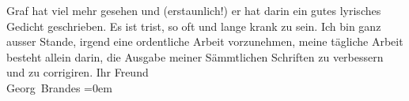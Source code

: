 \begin{ledgroupsized}[t]{13cm}
                    Graf hat viel mehr gesehen und (erstaunlich!) er hat darin ein gutes lyrisches
                    Gedicht geschrieben.\pend
           \pstart
           Es ist trist, so oft und lange krank zu sein. Ich bin ganz ausser Stande, irgend
                    eine ordentliche Arbeit vorzunehmen, meine tägliche Arbeit besteht allein darin,
                    die Ausgabe meiner Sämmtlichen
                        Schriften zu verbessern und zu corrigiren.\pend
           \pstart
           Ihr Freund{\\[\baselineskip]}\spacefill\mbox{Georg Brandes}\pend
           \leftskip=0em{}          \endnumbering{}\end{ledgroupsized}  \newcommand{\dateiname}{L01033}\newcommand{\titel}{Georg Brandes an Arthur Schnitzler, 30. 4. 1900}\newcommand{\editorInnen}{Martin Anton Müller und Gerd-Hermann Susen}
            \footnotesize
\begin{ledgroupsized}[t]{11.5cm}
\end{ledgroupsized}
         
      